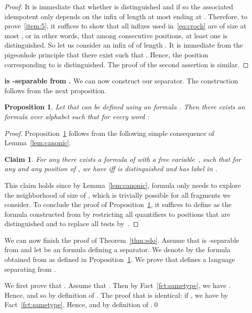 \documentclass[a4paper,USenglish]{lipics}
\theoremstyle{plain}
\newtheorem{proposition}[theorem]{Proposition}
\newtheorem{clm}[theorem]{Claim}
\begin{document}
\begin{proof}
  It is immediate that whether  is distinguished and if so the associated
  idempotent only depends on the infix  of length at most  ending at
  . Therefore, to prove~\ref{item:5}, it suffices to show that all infixes
   used in~\eqref{eq:croch} are of size at most , or in other words, that among 
  consecutive positions, at least one is distinguished. So let us consider an
  infix  of  of length . It is immediate
  from the pigeonhole principle that there exist  such that . Hence, the position corresponding to
   is distinguished. The proof of the second assertion is similar.
\end{proof}


\noindent
{\bf  is -separable from .} We can now construct our
separator. The construction follows from the next proposition.

\begin{proposition} \label{prop:comp}
  Let  that can be defined using an  formula
  . Then there exists an  formula  over alphabet
   such that for every word :
  
\end{proposition}

\begin{proof}
  Proposition~\ref{prop:comp} follows from the following simple
  consequence of Lemma~\ref{lem:canonic}.

  \begin{clm} \label{clm:canonic} For any  there exists a formula
     of  with a free variable~, such that for any  and any position  of , we have  iff
     is distinguished and  has label  in .
  \end{clm}

  This claim holds since by Lemma~\ref{lem:canonic}, formula  only needs to
  explore the neighborhood of size  of , which is trivially
  possible for all fragments  we consider.
  To conclude the proof of Proposition~\ref{prop:comp}, it suffices to
  define  as the formula constructed from  by restricting
  all quantifiers to positions that are distinguished and to replace
  all tests  by~.
\end{proof}

We can now finish the proof of Theorem~\ref{thm:sdo}. Assume that
 is -separable from  and let  be an 
formula defining a separator. We denote by  the  formula
obtained from  as defined in Proposition~\ref{prop:comp}. We
prove that  defines a language separating  from .

We first prove that . Assume that . Then by Fact~\ref{fct:sametype}, we have . Hence,  and so 
by definition of . The proof that  is identical: if  ,
we have  by Fact~\ref{fct:sametype}. Hence,
 and  by definition
of .\qed
\end{document}
